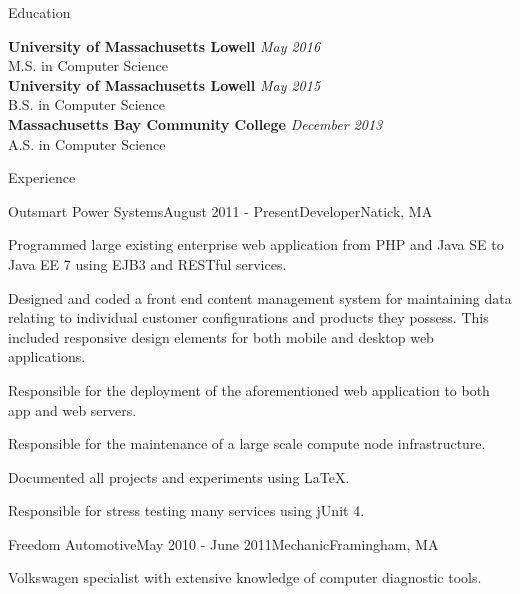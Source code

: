 \documentclass{resume} %
\begin{document}

\begin{rSection}{Education}

{\bf University of Massachusetts Lowell} \hfill {\em May 2016} \\ 
M.S. in Computer Science  \smallskip \\
{\bf University of Massachusetts Lowell} \hfill {\em May 2015} \\ 
B.S. in Computer Science  \smallskip \\
{\bf Massachusetts Bay Community College} \hfill {\em December 2013} \\ 
A.S. in Computer Science  \smallskip \\

\end{rSection}


\begin{rSection}{Experience}


\begin{rSubsection}{Outsmart Power Systems}{August 2011 - Present}{Developer}{Natick, MA}
\item Programmed large existing enterprise web application from PHP and Java SE to Java EE 7 using EJB3 and RESTful services.
\item Designed and coded a front end content management system for maintaining data relating to individual customer configurations and products they possess. This included responsive design elements for both mobile and desktop web applications.
\item Responsible for the deployment of the aforementioned web application to both app and web servers.
\item Responsible for the maintenance of a large scale compute node infrastructure.
\item Documented all projects and experiments using \LaTeX.
\item Responsible for stress testing many services using jUnit 4.
\end{rSubsection}


\begin{rSubsection}{Freedom Automotive}{May 2010 - June 2011}{Mechanic}{Framingham, MA}
\item Volkswagen specialist with extensive knowledge of computer diagnostic tools.
\end{rSubsection}


\end{rSection}
\end{document}
